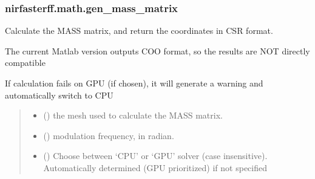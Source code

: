\documentclass[letterpaper,10pt,english]{sphinxmanual}
\begin{document}
\sphinxstepscope


\subsubsection{nirfasterff.math.gen\_mass\_matrix}
\label{\detokenize{_autosummary/nirfasterff.math.gen_mass_matrix:nirfasterff-math-gen-mass-matrix}}\label{\detokenize{_autosummary/nirfasterff.math.gen_mass_matrix::doc}}

\begin{fulllineitems}
\label{\detokenize{_autosummary/nirfasterff.math.gen_mass_matrix:nirfasterff.math.gen_mass_matrix}}
\pysigstartsignatures
\pysiglinewithargsret
{}
{\sphinxparamcomma {}\sphinxparamcomma {}\sphinxparamcomma {}}
{}
\pysigstopsignatures
\sphinxAtStartPar
Calculate the MASS matrix, and return the coordinates in CSR format.

\sphinxAtStartPar
The current Matlab version outputs COO format, so the results are NOT directly compatible

\sphinxAtStartPar
If calculation fails on GPU (if chosen), it will generate a warning and automatically switch to CPU
\begin{quote}\begin{description}
\begin{itemize}
\item {} 
\sphinxAtStartPar
{} () \textendash{} the mesh used to calculate the MASS matrix.

\item {} 
\sphinxAtStartPar
{} () \textendash{} modulation frequency, in radian.

\item {} 
\sphinxAtStartPar
{} (\sphinxstyleliteralemphasis{\sphinxupquote{, }}) \textendash{} Choose between ‘CPU’ or ‘GPU’ solver (case insensitive). Automatically determined (GPU prioritized) if not specified


\end{itemize}
\end{description}
\end{quote}
\end{fulllineitems}
\end{document}
